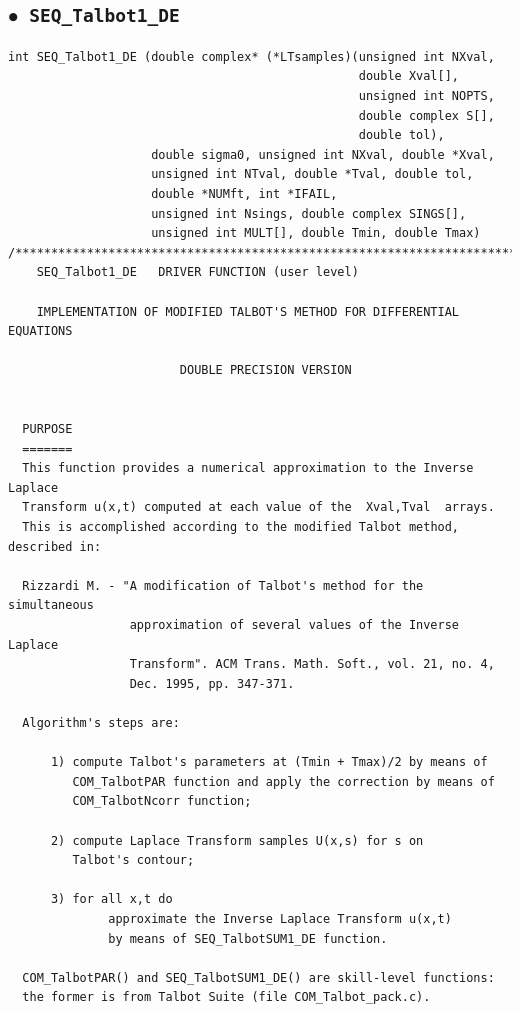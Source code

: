 \documentclass[a4paper,10pt]{report}%
\begin{document}
\subsection{\texorpdfstring{$\boldsymbol{\bullet}$}{ - }{\tt\ SEQ\_Talbot1\_DE}}
\begin{lstlisting}
int SEQ_Talbot1_DE (double complex* (*LTsamples)(unsigned int NXval,
                                                 double Xval[],
                                                 unsigned int NOPTS,
                                                 double complex S[],
                                                 double tol),
                    double sigma0, unsigned int NXval, double *Xval,
                    unsigned int NTval, double *Tval, double tol,
                    double *NUMft, int *IFAIL,
                    unsigned int Nsings, double complex SINGS[],
                    unsigned int MULT[], double Tmin, double Tmax)
/*****************************************************************************
    SEQ_Talbot1_DE   DRIVER FUNCTION (user level)

    IMPLEMENTATION OF MODIFIED TALBOT'S METHOD FOR DIFFERENTIAL EQUATIONS

                        DOUBLE PRECISION VERSION


  PURPOSE
  =======
  This function provides a numerical approximation to the Inverse Laplace
  Transform u(x,t) computed at each value of the  Xval,Tval  arrays.
  This is accomplished according to the modified Talbot method, described in:

  Rizzardi M. - "A modification of Talbot's method for the simultaneous
                 approximation of several values of the Inverse Laplace
                 Transform". ACM Trans. Math. Soft., vol. 21, no. 4,
                 Dec. 1995, pp. 347-371.

  Algorithm's steps are:

      1) compute Talbot's parameters at (Tmin + Tmax)/2 by means of
         COM_TalbotPAR function and apply the correction by means of
         COM_TalbotNcorr function;

      2) compute Laplace Transform samples U(x,s) for s on
         Talbot's contour;

      3) for all x,t do
              approximate the Inverse Laplace Transform u(x,t)
              by means of SEQ_TalbotSUM1_DE function.

  COM_TalbotPAR() and SEQ_TalbotSUM1_DE() are skill-level functions:
  the former is from Talbot Suite (file COM_Talbot_pack.c).



\end{lstlisting}
\end{document}

